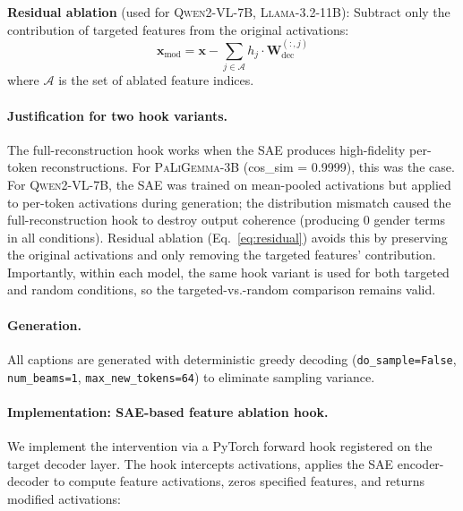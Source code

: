 \documentclass[11pt,a4paper]{article}
\newcommand{\modelname}[1]{\textsc{#1}}
\newcommand{\pali}{\modelname{PaLiGemma-3B}}
\newcommand{\qwen}{\modelname{Qwen2-VL-7B}}
\newcommand{\llama}{\modelname{Llama-3.2-11B}}
\newcommand{\sae}{SAE}
\begin{document}
\textbf{Residual ablation} (used for \qwen{}, \llama{}): Subtract only the contribution of targeted features from the original activations:
\begin{equation}
    \mathbf{x}_{\text{mod}} = \mathbf{x} - \sum_{j \in \mathcal{A}} h_j \cdot \mathbf{W}_{\text{dec}}^{(:,j)}
    \label{eq:residual}
\end{equation}
where $\mathcal{A}$ is the set of ablated feature indices.

\paragraph{Justification for two hook variants.}
The full-reconstruction hook works when the \sae{} produces high-fidelity per-token reconstructions.
For \pali{} (cos\_sim = 0.9999), this was the case.
For \qwen{}, the \sae{} was trained on mean-pooled activations but applied to per-token activations during generation; the distribution mismatch caused the full-reconstruction hook to destroy output coherence (producing 0 gender terms in all conditions).
Residual ablation (Eq.~\ref{eq:residual}) avoids this by preserving the original activations and only removing the targeted features' contribution.
Importantly, within each model, the same hook variant is used for both targeted and random conditions, so the targeted-vs.-random comparison remains valid.

\paragraph{Generation.}
All captions are generated with deterministic greedy decoding (\texttt{do\_sample=False}, \texttt{num\_beams=1}, \texttt{max\_new\_tokens=64}) to eliminate sampling variance.

\paragraph{Implementation: SAE-based feature ablation hook.}
We implement the intervention via a PyTorch forward hook registered on the target decoder layer.
The hook intercepts activations, applies the SAE encoder-decoder to compute feature activations, zeros specified features, and returns modified activations:
\end{document}
